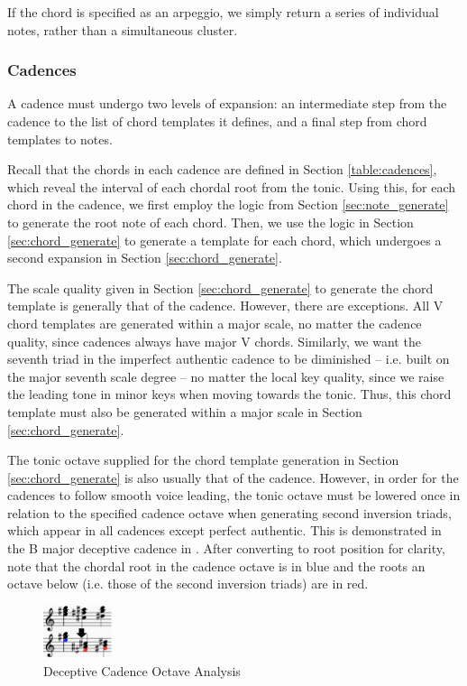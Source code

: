 \documentclass{article}
\begin{document}
If the chord is specified as an arpeggio, we simply return a series of individual notes, rather than a simultaneous cluster.

\subsubsection{Cadences}
A cadence must undergo two levels of expansion: an intermediate step from the cadence to the list of chord templates it defines, and a final step from chord templates to notes.

Recall that the chords in each cadence are defined in Section \ref{table:cadences}, which reveal the interval of each chordal root from the tonic. Using this, for each chord in the cadence, we first employ the logic from Section \ref{sec:note_generate} to generate the root note of each chord. Then, we use the logic in Section \ref{sec:chord_generate} to generate a template for each chord, which undergoes a second expansion in Section \ref{sec:chord_generate}.

The scale quality given in Section \ref{sec:chord_generate} to generate the chord template is generally that of the cadence. However, there are exceptions. All V chord templates are generated within a major scale, no matter the cadence quality, since cadences always have major V chords. Similarly, we want the seventh triad in the imperfect authentic cadence to be diminished – i.e. built on the major seventh scale degree – no matter the local key quality, since we raise the leading tone in minor keys when moving towards the tonic. Thus, this chord template must also be generated within a major scale in Section \ref{sec:chord_generate}.

The tonic octave supplied for the chord template generation in Section \ref{sec:chord_generate} is also usually that of the cadence. However, in order for the cadences to follow smooth voice leading, the tonic octave must be lowered once in relation to the specified cadence octave when generating second inversion triads, which appear in all cadences except perfect authentic. This is demonstrated in the B major deceptive cadence in . After converting to root position for clarity, note that the chordal root in the cadence octave is in blue and the roots an octave below (i.e. those of the second inversion triads) are in red.

\vspace{-2mm}
\begin{figure}[h!]
\centering
\includegraphics[width=0.18\textwidth]{images/cadence_octaves}
  \caption{Deceptive Cadence Octave Analysis}\label{fig:cadence_octaves}
\end{figure}
\vspace{-4mm}
\end{document}
